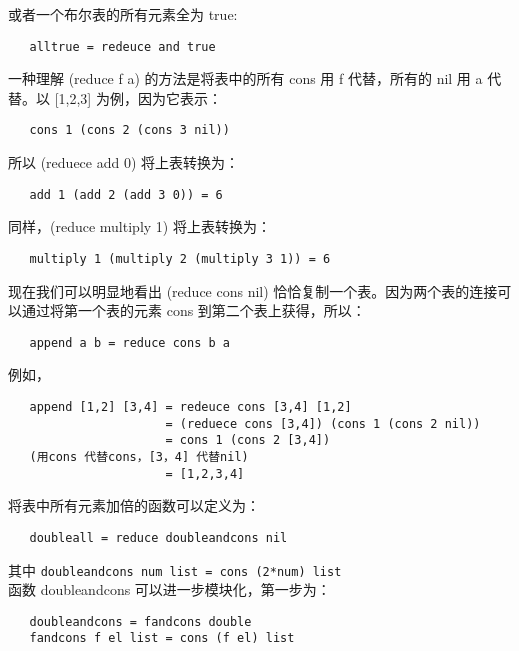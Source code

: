 \documentclass[12pt,a4paper]{article}
\begin{document}
或者一个布尔表的所有元素全为 true:

\begin{verbatim}
   alltrue = redeuce and true
\end{verbatim}

一种理解 (reduce f a) 的方法是将表中的所有 cons 用 f 代替，所有的 nil 用 a 代替。以 [1,2,3] 为例，因为它表示：

\begin{verbatim}
   cons 1 (cons 2 (cons 3 nil))
\end{verbatim}

所以 (reduece add 0) 将上表转换为：

\begin{verbatim}
   add 1 (add 2 (add 3 0)) = 6
\end{verbatim}

同样，(reduce multiply 1) 将上表转换为：

\begin{verbatim}
   multiply 1 (multiply 2 (multiply 3 1)) = 6
\end{verbatim}

现在我们可以明显地看出 (reduce cons nil) 恰恰复制一个表。因为两个表的连接可以通过将第一个表的元素 cons 到第二个表上获得，所以：

\begin{verbatim}
   append a b = reduce cons b a
\end{verbatim}

例如，
\begin{verbatim}
   append [1,2] [3,4] = redeuce cons [3,4] [1,2]
                      = (reduece cons [3,4]) (cons 1 (cons 2 nil))
                      = cons 1 (cons 2 [3,4])
   (用cons 代替cons，[3，4] 代替nil)
                      = [1,2,3,4]
\end{verbatim}

将表中所有元素加倍的函数可以定义为：

\begin{verbatim}
   doubleall = reduce doubleandcons nil
\end{verbatim}

其中 \verb"doubleandcons num list = cons (2*num) list"\\

函数 doubleandcons 可以进一步模块化，第一步为：

\begin{verbatim}
   doubleandcons = fandcons double
   fandcons f el list = cons (f el) list
\end{verbatim}
\end{document}
